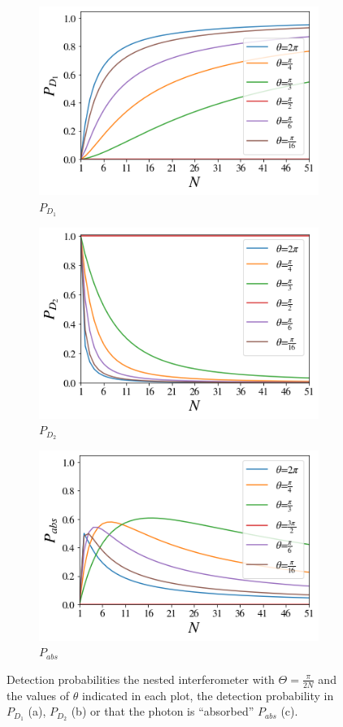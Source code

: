 \documentclass[12pt]{book}
\begin{document}
 \begin{figure}[t]
\centering
\begin{subfigure}[b]{0.45\linewidth}
\includegraphics[width=\linewidth,height=5 cm]{images/BS_Azuna.png}
\caption{$P_{D_{1}}$}
\label{fig:BS1}
\end{subfigure}
\begin{subfigure}[b]{0.45\linewidth}
\includegraphics[width=\linewidth,height=5 cm]{images/BS_AzunaD2.png}
\caption{$P_{D_{2}}$}
\label{fig:westminster_aerea}
\end{subfigure}
\begin{subfigure}[b]{0.45\linewidth}
\includegraphics[width=\linewidth,height=5 cm]{images/absorbido_azuna.png}
\caption{$P_{abs}$}
\label{fig:BS1}
\end{subfigure}
\caption{Detection probabilities the nested interferometer with $\Theta=\frac{\pi}{2N}$ and the values of $\theta$ indicated in each plot, the detection probability in $P_{D_{1}}$ (a), $P_{D_{2}}$ (b) or that the photon is ``absorbed'' $P_{abs}$ (c). }
\label{Azuma1}
\end{figure}
\end{document}
